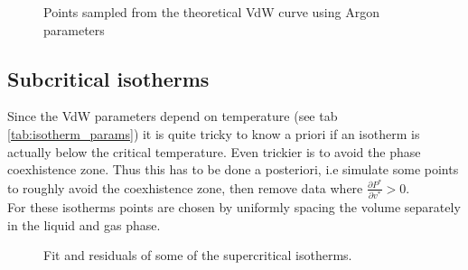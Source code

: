 \documentclass[a4paper, 11pt]{article}
\begin{document}

    \begin{figure}[H]
      \centering
       \hspace{-0.3cm}
       \hspace{-0.3cm}
      \caption{Points sampled from the theoretical VdW curve using Argon parameters}
      \label{fig:v_spacing}
    \end{figure}

    \subsection{Subcritical isotherms}
      Since the VdW parameters depend on temperature (see tab \ref{tab:isotherm_params}) it is quite tricky to know a priori if an isotherm is actually below the critical temperature. Even trickier is to avoid the phase coexhistence zone. Thus this has to be done a posteriori, i.e simulate some points to roughly avoid the coexhistence zone, then remove data where $\frac{\partial P^*}{\partial v^*} > 0$. \\
      For these isotherms points are chosen by uniformly spacing the volume separately in the liquid and gas phase.

    \begin{figure}[H]
      \centering
       \hspace{-0.5cm}
      \caption{Fit and residuals of some of the supercritical isotherms.}
      \label{fig:fit_isotherms}
    \end{figure}
\end{document}
